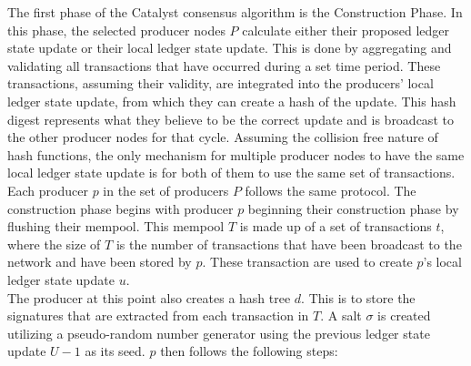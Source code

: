 The first phase of the Catalyst consensus algorithm is the Construction Phase. In this phase, the selected producer nodes $P$ calculate either their proposed ledger state update or their local ledger state update. %
This is done by aggregating and validating all transactions that have occurred during a set time period. These transactions, assuming their validity, are integrated into the producers' local ledger state update, from which they can create a hash of the update. This hash digest represents what they believe to be the correct update and is broadcast to the other producer nodes for that cycle. %
Assuming the collision free nature of hash functions, the only mechanism for multiple producer nodes to have the same local ledger state update is for both of them to use the same set of transactions. \\

Each producer $p$ in the set of producers $P$ follows the same protocol. The construction phase begins with producer $p$ beginning their construction phase by flushing their mempool. This mempool $T$ is made up of a set of transactions $t$, where the size of $T$ is the number of transactions that have been broadcast to the network and have been stored by $p$. These transaction are used to create $p$'s local ledger state update $u$. \\

The producer at this point also creates a hash tree $d$. This is to store the signatures that are extracted from each transaction in $T$. A salt $\sigma$ is created utilizing a pseudo-random number generator using the previous ledger state update $U-1$ as its seed. $p$ then follows the following steps:

